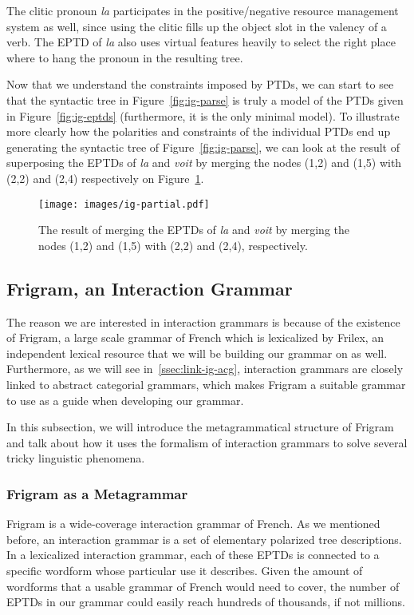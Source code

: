 The clitic pronoun \emph{la} participates in the positive/negative
resource management system as well, since using the clitic fills up the
object slot in the valency of a verb. The EPTD of \emph{la} also uses
virtual features heavily to select the right place where to hang the
pronoun in the resulting tree.

Now that we understand the constraints imposed by PTDs, we can start to
see that the syntactic tree in Figure~\ref{fig:ig-parse} is truly a
model of the PTDs given in Figure~\ref{fig:ig-eptds} (furthermore, it is
the only minimal model). To illustrate more clearly how the polarities
and constraints of the individual PTDs end up generating the syntactic
tree of Figure~\ref{fig:ig-parse}, we can look at the result of
superposing the EPTDs of \emph{la} and \emph{voit} by merging the nodes
(1,2) and (1,5) with (2,2) and (2,4) respectively on
Figure~\ref{fig:ig-partial}.

\begin{figure}
  \centering
  \texttt{[image: images/ig-partial.pdf]}
  \caption{\label{fig:ig-partial} The result of merging the EPTDs of
    \emph{la} and \emph{voit} by merging the nodes (1,2) and (1,5) with
    (2,2) and (2,4), respectively.}
\end{figure}

\subsection{Frigram, an Interaction Grammar}
\label{ssec:frigram}

The reason we are interested in interaction grammars is because of the
existence of Frigram, a large scale grammar of French which is
lexicalized by Frilex, an independent lexical resource that we will be
building our grammar on as well. Furthermore, as we will see
in~\ref{ssec:link-ig-acg}, interaction grammars are closely linked to
abstract categorial grammars, which makes Frigram a suitable grammar to
use as a guide when developing our grammar.

In this subsection, we will introduce the metagrammatical structure of
Frigram and talk about how it uses the formalism of interaction grammars
to solve several tricky linguistic phenomena.

\subsubsection{Frigram as a Metagrammar}

Frigram is a wide-coverage interaction grammar of French. As we
mentioned before, an interaction grammar is a set of elementary
polarized tree descriptions. In a lexicalized interaction grammar, each
of these EPTDs is connected to a specific wordform whose particular use
it describes. Given the amount of wordforms that a usable grammar of
French would need to cover, the number of EPTDs in our grammar could
easily reach hundreds of thousands, if not millions.

